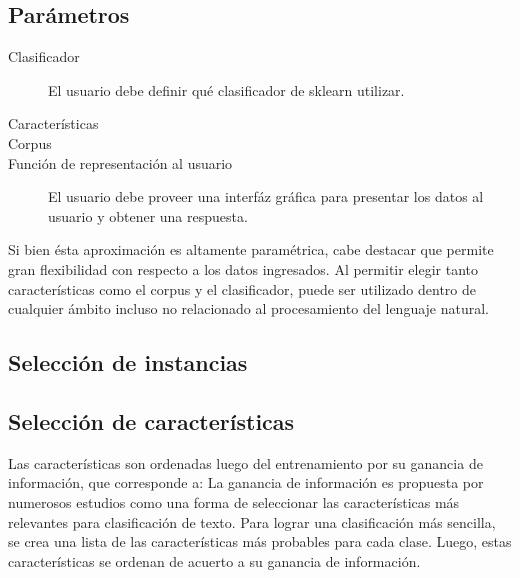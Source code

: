 \subsection{Parámetros}
\begin{description}
	\item[Clasificador] El usuario debe definir qué clasificador de sklearn utilizar.
	\item[Características]
	\item[Corpus]
	\item[Función de representación al usuario] El usuario debe proveer una interfáz gráfica para presentar los datos al usuario y obtener una respuesta.
\end{description}
Si bien ésta aproximación es altamente paramétrica, cabe destacar que permite gran flexibilidad con respecto a los datos ingresados. Al permitir elegir tanto características como el corpus y el clasificador, puede ser utilizado dentro de cualquier ámbito incluso no relacionado al procesamiento del lenguaje natural.

\subsection{Selección de instancias}
\subsection{Selección de características}
Las características son ordenadas luego del entrenamiento por su ganancia de información, que corresponde a:
La ganancia de información es propuesta por numerosos estudios como una forma de seleccionar las características más relevantes para clasificación de texto.
Para lograr una clasificación más sencilla, se crea una lista de las características más probables para cada clase. Luego, estas características se ordenan de acuerto a su ganancia de información.

